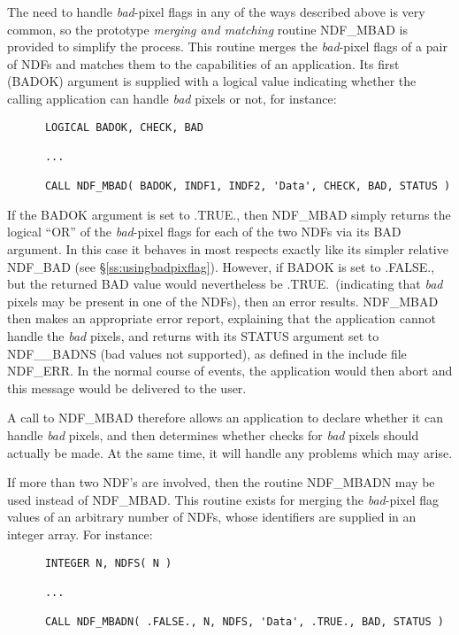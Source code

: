 \documentclass[twoside,11pt]{article}
\newcommand{\htmlref}[2]{#1}
\newcommand{\st}[1]{{\em{#1}}}
\begin{document}
The need to handle \st{bad\/}-pixel flags in any of the ways described above
is very common, so the prototype \st{merging and matching\/} routine
\htmlref{NDF\_MBAD}{NDF_MBAD} is provided to simplify the process.
This routine merges the \st{bad\/}-pixel flags of a pair of NDFs and matches
them to the capabilities of an application.
Its first (BADOK) argument is supplied with a logical value indicating whether
the calling application can handle \st{bad\/} pixels or not, for instance: 

\small
\begin{verbatim}
      LOGICAL BADOK, CHECK, BAD

      ...

      CALL NDF_MBAD( BADOK, INDF1, INDF2, 'Data', CHECK, BAD, STATUS )
\end{verbatim}
\normalsize

If the BADOK argument is set to .TRUE., then NDF\_MBAD simply returns
the logical ``OR'' of the \st{bad\/}-pixel flags for each of the two NDFs via 
its BAD argument.
In this case it behaves in most respects exactly like its simpler relative
\htmlref{NDF\_BAD}{NDF_BAD} (see \S\ref{ss:usingbadpixflag}). 
However, if BADOK is set to .FALSE., but the returned BAD value would
nevertheless be .TRUE.\ (indicating that \st{bad\/} pixels may be present in
one of the NDFs), then an error results. 
NDF\_MBAD then makes an appropriate error report, explaining that the
application cannot handle the \st{bad\/} pixels, and returns with its STATUS
argument set to NDF\_\_BADNS (bad values not supported), as defined in the
include file NDF\_ERR. 
In the normal course of events, the application would then abort and this
message would be delivered to the user. 

A call to NDF\_MBAD therefore allows an application to declare whether it
can handle \st{bad\/} pixels, and then determines whether checks for \st{bad\/}
pixels should actually be made. 
At the same time, it will handle any problems which may arise. 

If more than two NDF's are involved, then the routine \htmlref{NDF\_MBADN}{NDF_MBADN} may be 
used instead of NDF\_MBAD.
This routine exists for merging the \st{bad}-pixel flag values of an
arbitrary number of NDFs, whose identifiers are supplied in an integer
array. 
For instance: 

\small
\begin{verbatim}
      INTEGER N, NDFS( N )

      ...

      CALL NDF_MBADN( .FALSE., N, NDFS, 'Data', .TRUE., BAD, STATUS )
\end{verbatim}
\normalsize
\end{document}
